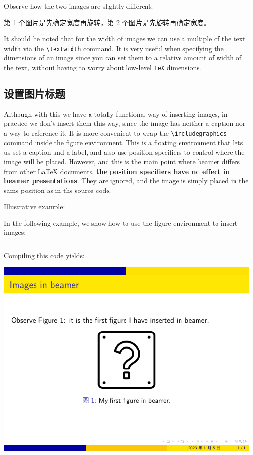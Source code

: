 Observe how the two images are slightly different.

第 1 个图片是先确定宽度再旋转，第 2 个图片是先旋转再确定宽度。

It should be noted that for the width of images we can use a multiple of the text width via the \verb|\textwidth| command. It is very useful when specifying the dimensions of an image since you can set them to a relative amount of width of the text, without having to worry about low-level \verb|TeX| dimensions.

\subsection{设置图片标题}

Although with this we have a totally functional way of inserting images, in practice we don’t insert them this way, since the image has neither a caption nor a way to reference it. It is more convenient to wrap the \verb|\includegraphics| command inside the figure environment. This is a floating environment that lets us set a caption and a label, and also use position specifiers to control where the image will be placed. However, and this is the main point where beamer differs from other {\LaTeX} documents, \textbf{the position specifiers have no effect in beamer presentations}. They are ignored, and the image is simply placed in the same position as in the source code.

Illustrative example:

In the following example, we show how to use the figure environment to insert images:

\inputminted[linenos=true]{latex}{examples/beamer/beamerfigure02.tex}

Compiling this code yields:

\includegraphics{examples/beamer/beamerfigure02.pdf}

